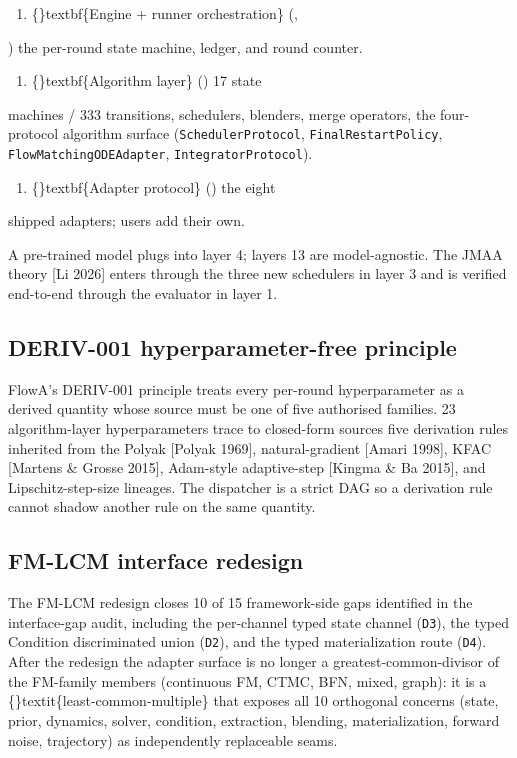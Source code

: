 \documentclass{article}
\begin{document}
\begin{enumerate}
\item \{\}textbf\{Engine + runner orchestration\} (,
\end{enumerate}
)  the per-round state machine, ledger, and round counter.

\begin{enumerate}
\item \{\}textbf\{Algorithm layer\} ()  17 state
\end{enumerate}
machines / 333 transitions, schedulers, blenders, merge operators, the four-protocol algorithm surface (\texttt{SchedulerProtocol}, \texttt{FinalRestartPolicy}, \texttt{FlowMatchingODEAdapter}, \texttt{IntegratorProtocol}).

\begin{enumerate}
\item \{\}textbf\{Adapter protocol\} ()  the eight
\end{enumerate}
shipped adapters; users add their own.

A pre-trained model plugs into layer 4; layers 13 are model-agnostic. The JMAA theory [Li 2026] enters through the three new schedulers in layer 3 and is verified end-to-end through the evaluator in layer 1.

\subsection{DERIV-001 hyperparameter-free principle}
FlowA's DERIV-001 principle treats every per-round hyperparameter as a derived quantity whose source must be one of five authorised families. 23 algorithm-layer hyperparameters trace to closed-form sources  five derivation rules inherited from the Polyak [Polyak 1969], natural-gradient [Amari 1998], KFAC [Martens \& Grosse 2015], Adam-style adaptive-step [Kingma \& Ba 2015], and Lipschitz-step-size lineages. The dispatcher is a strict DAG so a derivation rule cannot shadow another rule on the same quantity.

\subsection{FM-LCM interface redesign}
The FM-LCM redesign closes 10 of 15 framework-side gaps identified in the interface-gap audit, including the per-channel typed state channel (\texttt{D3}), the typed Condition discriminated union (\texttt{D2}), and the typed materialization route (\texttt{D4}). After the redesign the adapter surface is no longer a greatest-common-divisor of the FM-family members (continuous FM, CTMC, BFN, mixed, graph): it is a \{\}textit\{least-common-multiple\} that exposes all 10 orthogonal concerns (state, prior, dynamics, solver, condition, extraction, blending, materialization, forward noise, trajectory) as independently replaceable seams.
\end{document}

